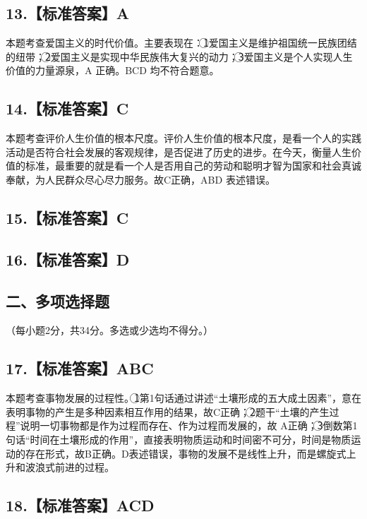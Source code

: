 \documentclass[UTF8,11pt]{ctexart}
\begin{document}
\subsection*{13.【标准答案】A}

本题考查爱国主义的时代价值。主要表现在：\textcircled{1}爱国主义是维护祖国统一民族团结的纽带；\textcircled{2}爱国主义是实现中华民族伟大复兴的动力；\textcircled{3}爱国主义是个人实现人生价值的力量源泉，A 正确。BCD 均不符合题意。


\subsection*{14.【标准答案】C}

本题考查评价人生价值的根本尺度。评价人生价值的根本尺度，是看一个人的实践活动是否符合社会发展的客观规律，是否促进了历史的进步。在今天，衡量人生价值的标准，最重要的就是看一个人是否用自己的劳动和聪明才智为国家和社会真诚奉献，为人民群众尽心尽力服务。故C正确，ABD 表述错误。


\subsection*{15.【标准答案】C}

\subsection*{16.【标准答案】D}

\subsection*{二、多项选择题}

（每小题2分，共34分。多选或少选均不得分。）


\subsection*{17.【标准答案】ABC}

本题考查事物发展的过程性。\textcircled{1}第1句话通过讲述“土壤形成的五大成土因素”，意在表明事物的产生是多种因素相互作用的结果，故C正确；\textcircled{2}题干“土壤的产生过程”说明一切事物都是作为过程而存在、作为过程而发展的，故 A正确；\textcircled{3}倒数第1句话“时间在土壤形成的作用”，直接表明物质运动和时间密不可分，时间是物质运动的存在形式，故B正确。D表述错误，事物的发展不是线性上升，而是螺旋式上升和波浪式前进的过程。


\subsection*{18.【标准答案】ACD}
\end{document}
